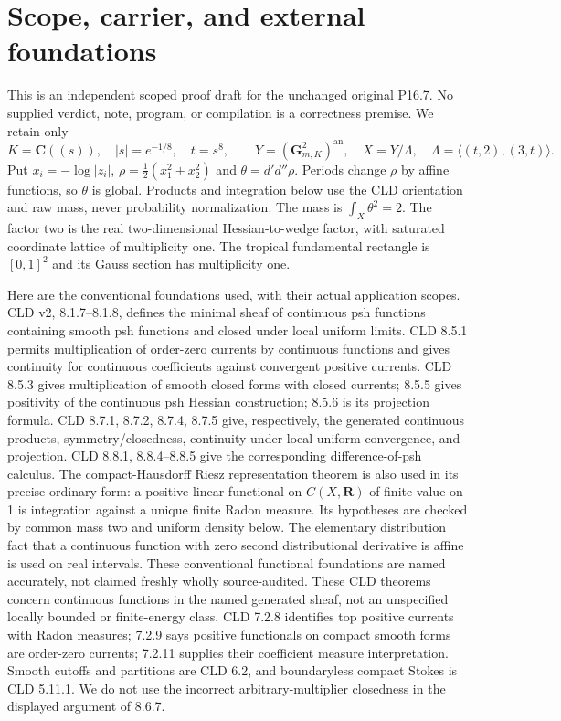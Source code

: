 \section{Scope, carrier, and external foundations}
This is an independent scoped proof draft for the unchanged original P16.7.
No supplied verdict, note, program, or compilation is a correctness premise.
We retain only
\[
 K=\mathbf C((s)),\quad |s|=e^{-1/8},\quad t=s^8,\qquad
 Y=(\mathbf G_{m,K}^{2})^{\mathrm{an}},\quad
 X=Y/\Lambda,\quad \Lambda=\langle(t,2),(3,t)\rangle.
\]
Put $x_i=-\log|z_i|$, $\rho=\frac12(x_1^2+x_2^2)$ and
$\theta=d'd''\rho$. Periods change $\rho$ by affine functions, so $\theta$
is global. Products and integration below use the CLD orientation and raw mass,
never probability normalization. The mass is $\int_X\theta^2=2$.
The factor two is the real two-dimensional Hessian-to-wedge factor, with
saturated coordinate lattice of multiplicity one. The tropical fundamental
rectangle is $[0,1]^2$ and its Gauss section has multiplicity one.

Here are the conventional foundations used, with their actual application scopes.
CLD v2, 8.1.7--8.1.8, defines the minimal sheaf of continuous psh functions
containing smooth psh functions and closed under local uniform limits.
CLD 8.5.1 permits multiplication of order-zero currents by continuous functions
and gives continuity for continuous coefficients against convergent positive
currents. CLD 8.5.3 gives multiplication of smooth closed forms with closed
currents; 8.5.5 gives positivity of the continuous psh Hessian construction;
8.5.6 is its projection formula. CLD 8.7.1, 8.7.2, 8.7.4, 8.7.5 give,
respectively, the generated continuous products, symmetry/closedness,
continuity under local uniform convergence, and projection. CLD 8.8.1,
8.8.4--8.8.5 give the corresponding difference-of-psh calculus.
The compact-Hausdorff Riesz representation theorem is also used in its precise
ordinary form: a positive linear functional on $C(X,\mathbf R)$ of finite
value on 1 is integration against a unique finite Radon measure. Its hypotheses
are checked by common mass two and uniform density below. The elementary
distribution fact that a continuous function with zero second distributional
derivative is affine is used on real intervals. These conventional functional
foundations are named accurately, not claimed freshly wholly source-audited.
These CLD theorems concern continuous functions in the named generated sheaf,
not an unspecified locally bounded or finite-energy class.
CLD 7.2.8 identifies top positive currents with Radon measures; 7.2.9 says
positive functionals on compact smooth forms are order-zero currents;
7.2.11 supplies their coefficient measure interpretation.
Smooth cutoffs and partitions are CLD 6.2, and boundaryless compact Stokes
is CLD 5.11.1. We do not use the incorrect arbitrary-multiplier closedness
in the displayed argument of 8.6.7.

